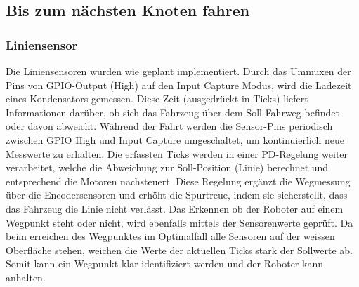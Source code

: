 \newpage

\subsection{Bis zum nächsten Knoten fahren}

\subsubsection{Liniensensor}

Die Liniensensoren wurden wie geplant implementiert. Durch das Ummuxen der Pins von GPIO-Output (High) auf den Input Capture Modus, wird die Ladezeit eines Kondensators gemessen. Diese Zeit (ausgedrückt in Ticks) liefert Informationen darüber, ob sich das Fahrzeug über dem Soll-Fahrweg befindet oder davon abweicht. Während der Fahrt werden die Sensor-Pins periodisch zwischen GPIO High und Input Capture umgeschaltet, um kontinuierlich neue Messwerte zu erhalten. Die erfassten Ticks werden in einer PD-Regelung weiter verarbeitet, welche die Abweichung zur Soll-Position (Linie) berechnet und entsprechend die Motoren nachsteuert. Diese Regelung ergänzt die Wegmessung über die Encodersensoren und erhöht die Spurtreue, indem sie sicherstellt, dass das Fahrzeug die Linie nicht verlässt. Das Erkennen ob der Roboter auf einem Wegpunkt steht oder nicht, wird ebenfalls mittels der Sensorenwerte geprüft. Da beim erreichen des Wegpunktes im Optimalfall alle Sensoren auf der weissen Oberfläche stehen, weichen die Werte der aktuellen Ticks stark der Sollwerte ab. Somit kann ein Wegpunkt klar identifiziert werden und der Roboter kann anhalten.



